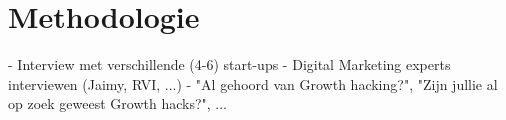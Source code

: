 
\chapter{Methodologie}
\label{ch:methodologie}


- Interview met verschillende (4-6) start-ups
- Digital Marketing experts interviewen (Jaimy, RVI, ...)
- "Al gehoord van Growth hacking?", "Zijn jullie al op zoek geweest Growth hacks?", ...

\lipsum[21-25]

